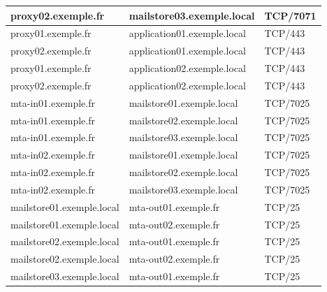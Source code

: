 \documentclass[11pt,a4paper]{report}
\begin{document}
\begin{longtable}{|p{5cm}|p{5cm}|p{5cm}|}
\hline
proxy02.\allowbreak{}exemple.\allowbreak{}fr & mailstore03.\allowbreak{}exemple.\allowbreak{}local & TCP/7071 \\
\hline
proxy01.\allowbreak{}exemple.\allowbreak{}fr & application01.\allowbreak{}exemple.\allowbreak{}local & TCP/443 \\
\hline
proxy02.\allowbreak{}exemple.\allowbreak{}fr & application01.\allowbreak{}exemple.\allowbreak{}local & TCP/443 \\
\hline
proxy01.\allowbreak{}exemple.\allowbreak{}fr & application02.\allowbreak{}exemple.\allowbreak{}local & TCP/443 \\
\hline
proxy02.\allowbreak{}exemple.\allowbreak{}fr & application02.\allowbreak{}exemple.\allowbreak{}local & TCP/443 \\
\hline
mta-\allowbreak{}in01.\allowbreak{}exemple.\allowbreak{}fr & mailstore01.\allowbreak{}exemple.\allowbreak{}local & TCP/7025 \\
\hline
mta-\allowbreak{}in01.\allowbreak{}exemple.\allowbreak{}fr & mailstore02.\allowbreak{}exemple.\allowbreak{}local & TCP/7025 \\
\hline
mta-\allowbreak{}in01.\allowbreak{}exemple.\allowbreak{}fr & mailstore03.\allowbreak{}exemple.\allowbreak{}local & TCP/7025 \\
\hline
mta-\allowbreak{}in02.\allowbreak{}exemple.\allowbreak{}fr & mailstore01.\allowbreak{}exemple.\allowbreak{}local & TCP/7025 \\
\hline
mta-\allowbreak{}in02.\allowbreak{}exemple.\allowbreak{}fr & mailstore02.\allowbreak{}exemple.\allowbreak{}local & TCP/7025 \\
\hline
mta-\allowbreak{}in02.\allowbreak{}exemple.\allowbreak{}fr & mailstore03.\allowbreak{}exemple.\allowbreak{}local & TCP/7025 \\
\hline
mailstore01.\allowbreak{}exemple.\allowbreak{}local & mta-\allowbreak{}out01.\allowbreak{}exemple.\allowbreak{}fr & TCP/25 \\
\hline
mailstore01.\allowbreak{}exemple.\allowbreak{}local & mta-\allowbreak{}out02.\allowbreak{}exemple.\allowbreak{}fr & TCP/25 \\
\hline
mailstore02.\allowbreak{}exemple.\allowbreak{}local & mta-\allowbreak{}out01.\allowbreak{}exemple.\allowbreak{}fr & TCP/25 \\
\hline
mailstore02.\allowbreak{}exemple.\allowbreak{}local & mta-\allowbreak{}out02.\allowbreak{}exemple.\allowbreak{}fr & TCP/25 \\
\hline
mailstore03.\allowbreak{}exemple.\allowbreak{}local & mta-\allowbreak{}out01.\allowbreak{}exemple.\allowbreak{}fr & TCP/25 \\

\end{longtable}
\end{document}
